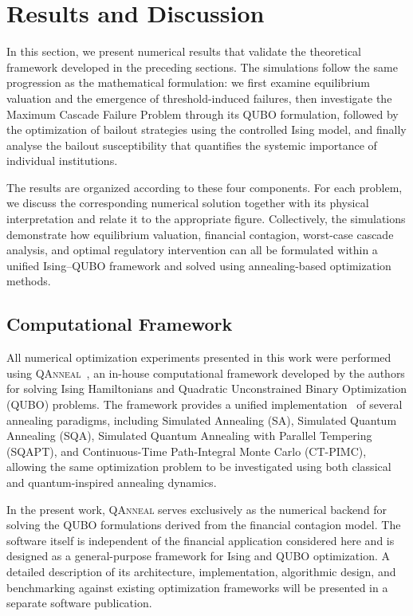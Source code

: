 \documentclass[aps,reprint,superscriptaddress,pra]{revtex4-2}
\begin{document}
\section{Results and Discussion}
\label{sec:results_discussion}

In this section, we present numerical results that validate the theoretical framework developed in the preceding sections. The simulations follow the same progression as the mathematical formulation: we first examine equilibrium valuation and the emergence of threshold-induced failures, then investigate the Maximum Cascade Failure Problem through its QUBO formulation, followed by the optimization of bailout strategies using the controlled Ising model, and finally analyse the bailout susceptibility that quantifies the systemic importance of individual institutions.

The results are organized according to these four components. For each problem, we discuss the corresponding numerical solution together with its physical interpretation and relate it to the appropriate figure. Collectively, the simulations demonstrate how equilibrium valuation, financial contagion, worst-case cascade analysis, and optimal regulatory intervention can all be formulated within a unified Ising--QUBO framework and solved using annealing-based optimization methods.

\subsection{Computational Framework}

All numerical optimization experiments presented in this work were performed
using \textsc{QAnneal}~\cite{qanneal2026}, an in-house computational framework developed by the
authors for solving Ising Hamiltonians and Quadratic Unconstrained Binary
Optimization (QUBO) problems. The framework provides a unified implementation~\cite{ding2019towards}
of several annealing paradigms, including Simulated Annealing (SA), \cite{lucas2014ising,
glover2019,
johnson2011quantum}
Simulated Quantum Annealing (SQA), Simulated Quantum Annealing with Parallel
Tempering (SQAPT), and Continuous-Time Path-Integral Monte Carlo (CT-PIMC), \cite{santoro2002theory}
allowing the same optimization problem to be investigated using both classical
and quantum-inspired annealing dynamics.\cite{kadowaki1998quantum}

In the present work, \textsc{QAnneal} serves exclusively as the numerical
backend for solving the QUBO formulations derived from the financial contagion
model. The software itself is independent of the financial application
considered here and is designed as a general-purpose framework for Ising and
QUBO optimization. A detailed description of its architecture, implementation,
algorithmic design, and benchmarking against existing optimization frameworks
will be presented in a separate software publication.
\end{document}
